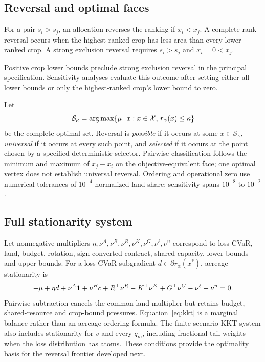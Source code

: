 \subsection{Reversal and optimal faces}

\begin{definition}
For a pair \(s_i>s_j\), an allocation reverses the ranking if \(x_i<x_j\).
A complete rank reversal occurs when the highest-ranked crop has less area
than every lower-ranked crop. A strong exclusion reversal requires
\(s_i>s_j\) and \(x_i=0<x_j\).
\end{definition}

Positive crop lower bounds preclude strong exclusion reversal in the principal
specification. Sensitivity analyses evaluate this outcome after setting either
all lower bounds or only the highest-ranked crop's lower bound to zero.

Let
\[
\mathcal S_\kappa=\operatorname*{arg\,max}\{\mu^\top x:x\in\mathcal X,\,
r_\alpha(x)\le\kappa\}
\]
be the complete optimal set. Reversal is \emph{possible} if it occurs at some
\(x\in\mathcal S_\kappa\), \emph{universal} if it occurs at every such point,
and \emph{selected} if it occurs at the point chosen by a specified
deterministic selector. Pairwise classification follows the minimum and
maximum of \(x_j-x_i\) on the objective-equivalent face; one optimal vertex
does not establish universal reversal. Ordering and operational zero use numerical
tolerances of \(10^{-4}\) normalized land share; sensitivity spans
\(10^{-8}\) to \(10^{-2}\).

\subsection{Full stationarity system}

Let nonnegative multipliers
\(\eta,\nu^A,\nu^B,\nu^R,\nu^K,\nu^G,\nu^\ell,\nu^u\)
correspond to loss-CVaR, land, budget, rotation, sign-converted contract,
shared capacity, lower bounds and upper bounds. For a loss-CVaR subgradient
\(d\in\partial r_\alpha(x^*)\), acreage stationarity is
\begin{equation}
-\mu+\eta d+\nu^A\mathbf 1+\nu^B c+R^\top\nu^R-K^\top\nu^K+
G^\top\nu^G-\nu^\ell+\nu^u=0.
\label{eq:kkt}
\end{equation}
Pairwise subtraction cancels the common land multiplier but retains budget,
shared-resource and crop-bound pressures. Equation~\ref{eq:kkt} is a marginal
balance rather than an acreage-ordering formula. The finite-scenario KKT
system also includes stationarity for \(v\) and every \(q_m\), including
fractional tail weights when the loss distribution has atoms. These
conditions provide the optimality basis for the reversal frontier developed
next.

